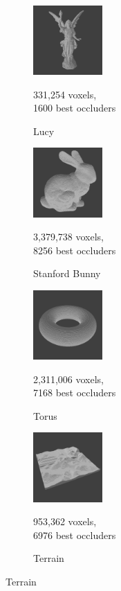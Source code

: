 \documentclass[conference]{IEEEtran}
\begin{document}
\begin{figure}
    \begin{subfigure}{100px}
        \includegraphics[width=100px]{images/model-lucy.jpg}
        \caption{Lucy \cite{b7}}
        \parbox{\linewidth}{\centering\footnotesize 331,254 voxels,\\ 1600 best occluders}
    \end{subfigure}
    \begin{subfigure}{100px}
        \includegraphics[width=100px]{images/model-bunny.jpg}
        \caption{Stanford Bunny \cite{b7}}
        \parbox{\linewidth}{\centering\footnotesize 3,379,738 voxels,\\ 8256 best occluders}
    \end{subfigure}
    \begin{subfigure}{100px}
        \includegraphics[width=100px]{images/model-torus.jpg}
        \caption{Torus}
        \parbox{\linewidth}{\centering\footnotesize 2,311,006 voxels,\\ 7168 best occluders}
    \end{subfigure}
    \begin{subfigure}{100px}
        \includegraphics[width=100px]{images/model-terrain.jpg}
        \caption{Terrain}
        \parbox{\linewidth}{\centering\footnotesize 953,362 voxels,\\ 6976 best occluders}

\end{subfigure}
\end{figure}
\end{document}
